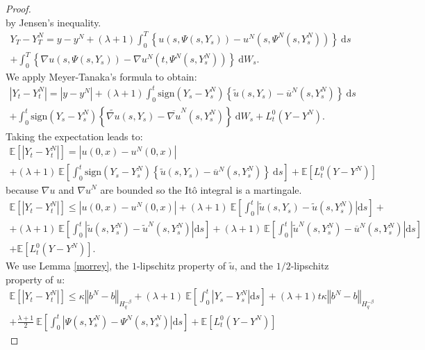 \documentclass[11pt]{enstaPRE}
\newcommand{\norme}[1]{\left\Vert #1\right\Vert}
\newcommand{\E}{\mathbb{E}}
\newcommand{\di}{\mathrm{d}}
\begin{document}
\begin{proof}
\begin{equation}
    \end{equation}    
    by Jensen's inequality. 
    \begin{multline*}
    Y_T-Y_T^N = y-y^N + (\lambda + 1 )\int_0^T\left\{u\left(s,\Psi\left(s,Y_s\right)\right)-u^N\left(s,\Psi^N\left(s,Y_s^N\right)\right)\right\}\ \di s\\ + \int_0^T\left\{\nabla u\left(s,\Psi\left(s,Y_s\right)\right)-\nabla u^N\left(t,\Psi^N\left(s,Y_s^N\right)\right)\right\}\ \di W_s.
    \end{multline*}
    We apply Meyer-Tanaka's formula to obtain:
    \begin{multline*}
    \left|Y_t-Y_t^N\right| = \left|y-y^N\right| + (\lambda + 1) \int_0^t\mathrm{sign}(Y_s-Y_s^N)\left\{\widetilde{u}\left(s,Y_s\right)-\overline{u}^N\left(s,Y_s^N\right)\right\}\ \di s\\ + \int_0^t\mathrm{sign}(Y_s-Y_s^N)\left\{\widetilde{\nabla u}\left(s,Y_s\right)-\overline{\nabla u}^N\left(s,Y_s^N\right)\right\}\ \di W_s + L_t^0(Y-Y^N).
    \end{multline*}    
    Taking the expectation leads to:
    \begin{multline*}
    \E\left[\left|Y_t-Y_t^N\right|\right] =  \left|u(0,x)-u^N(0,x)\right|\\ + (\lambda + 1)\ \E\left[\int_0^t\mathrm{sign}(Y_s-Y_s^N)\left\{\widetilde{u}\left(s,Y_s\right)-\overline{u}^N\left(s,Y_s^N\right)\right\}\ \di s\right] + \E \left[L_t^0(Y-Y^N)\right]
    \end{multline*}
    because ${\nabla u}$ and ${\nabla u}^N$ are bounded so the Itô integral is a martingale.    
    \begin{multline*}
    \E\left[\left|Y_t-Y_t^N\right|\right]\leq \left|u(0,x)-u^N(0,x)\right| + (\lambda + 1)\ \E\left[\int_0^t\left|\widetilde{u}\left(s,Y_s\right)-\widetilde{u}\left(s,Y_s^N\right)\right| \di s\right]+ \\ + (\lambda + 1)\ \E\left[\int_0^t\left|\widetilde{u}\left(s,Y_s^N\right)-\widetilde{u}^N\left(s,Y_s^N\right)\right| \di s\right] + (\lambda + 1)\ \E\left[\int_0^t\left|\widetilde{u}^N\left(s,Y_s^N\right)-\overline{u}^N\left(s,Y_s^N\right)\right| \di s\right]\\ + \E \left[L_t^0(Y-Y^N)\right].
    \end{multline*}
    We use Lemma \ref{morrey}, the $1$-lipschitz property of $\widetilde{u}$, and the $1/2$-lipschitz property of $u$:
    \begin{multline*}
    \E\left[\left|Y_t-Y_t^N\right|\right]\leq \kappa\norme{b^N-b}_{H^{-\beta}_{q}} + (\lambda + 1)\ \E\left[\int_0^t\left|Y_s-Y_s^N\right| \di s\right] + (\lambda + 1)t\kappa\norme{b^N-b}_{H^{-\beta}_{q}}\\+ \frac{\lambda + 1}{2}\ \E\left[\int_0^t\left|\Psi\left(s,Y_s^N\right)-\Psi^N\left(s,Y_s^N\right)\right| \di s\right]  + \E \left[L_t^0(Y-Y^N)\right]

\end{multline*}
\end{proof}
\end{document}
